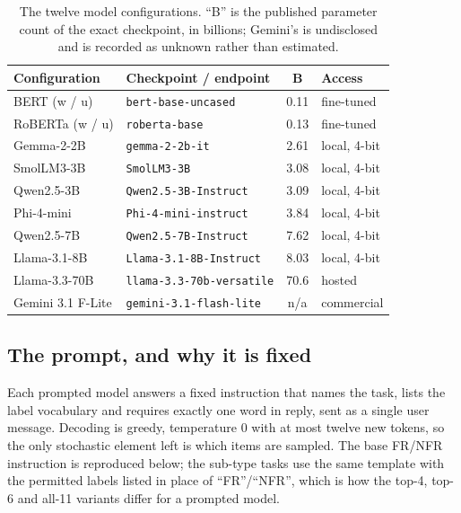 \documentclass[conference]{IEEEtran}
\begin{document}
\begin{table}[t]
\caption{The twelve model configurations. ``B'' is the published parameter count
of the exact checkpoint, in billions; Gemini's is undisclosed and is recorded as
unknown rather than estimated.}
\label{tab:configs}
\centering
\scriptsize
\setlength{\tabcolsep}{4pt}
\renewcommand{\arraystretch}{1.02}
\begin{tabular}{@{}llcl@{}}
\toprule
\textbf{Configuration} & \textbf{Checkpoint / endpoint} & \textbf{B} & \textbf{Access} \\
\midrule
BERT (w / u)        & \texttt{bert-base-uncased}     & 0.11 & fine-tuned \\
RoBERTa (w / u)     & \texttt{roberta-base}          & 0.13 & fine-tuned \\
\addlinespace[1.5pt]
Gemma-2-2B          & \texttt{gemma-2-2b-it}         & 2.61 & local, 4-bit \\
SmolLM3-3B          & \texttt{SmolLM3-3B}            & 3.08 & local, 4-bit \\
Qwen2.5-3B          & \texttt{Qwen2.5-3B-Instruct}   & 3.09 & local, 4-bit \\
Phi-4-mini          & \texttt{Phi-4-mini-instruct}   & 3.84 & local, 4-bit \\
Qwen2.5-7B          & \texttt{Qwen2.5-7B-Instruct}   & 7.62 & local, 4-bit \\
Llama-3.1-8B        & \texttt{Llama-3.1-8B-Instruct} & 8.03 & local, 4-bit \\
\addlinespace[1.5pt]
Llama-3.3-70B       & \texttt{llama-3.3-70b-versatile} & 70.6 & hosted \\
Gemini 3.1 F-Lite   & \texttt{gemini-3.1-flash-lite} & n/a  & commercial \\
\bottomrule
\end{tabular}
\end{table}

\subsection{The prompt, and why it is fixed}
\label{sec:prompt}
Each prompted model answers a fixed instruction that names the task, lists the
label vocabulary and requires exactly one word in reply, sent as a single user
message. Decoding is greedy, temperature 0 with at most twelve new tokens, so the
only stochastic element left is which items are sampled. The base FR/NFR
instruction is reproduced below; the sub-type tasks use the same template with
the permitted labels listed in place of ``FR''/``NFR'', which is how the top-4,
top-6 and all-11 variants differ for a prompted model.
\end{document}
